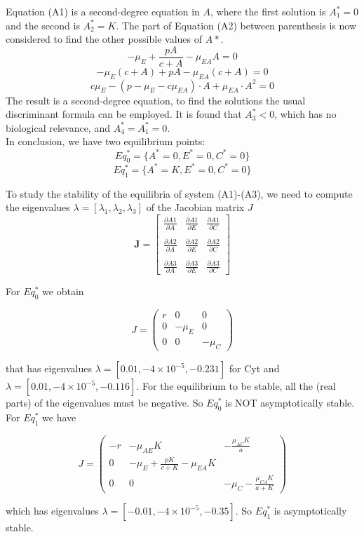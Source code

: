 Equation (A1) is a second-degree equation in $A$, where the first solution is $A^*_1=0$ and the second is $A^*_2=K$. The part of Equation (A2) between parenthesis is now considered to find the other possible values of $A*$.
\[ -\mu_E + \frac{pA}{c+A} - \mu_{EA}A = 0 \]
\[ -\mu_E(c+A) + pA - \mu_{EA}(c+A) = 0\]
\[c\mu_E - (p -\mu_E - c\mu_{EA})\cdot A + \mu_{EA}\cdot A^2 = 0\]
The result is a second-degree equation, to find the solutions the usual discriminant formula can be employed. It is found that $A^*_3 < 0$, which has no biological relevance, and $A^*_4 = A^*_1 = 0$.\\
In conclusion, we have two equilibrium points: 
\[Eq_0^* = \{A^* = 0, E^* = 0, C^* = 0\}\]
\[Eq_1^* = \{A^* = K, E^* = 0, C^* = 0\}\]

To study the stability of the equilibria of system (A1)-(A3), we need to compute the eigenvalues $\lambda = [\lambda_1,\lambda_2,\lambda_3]$ of the Jacobian matrix $J$
\[ \mathbf{J} = \begin{bmatrix} \frac{\partial A1}{\partial A} & \frac{\partial A1}{\partial E} & \frac{\partial A1}{\partial C} \\ \\
\frac{\partial A2}{\partial A} & \frac{\partial A2}{\partial E} & \frac{\partial A2}{\partial C}\\ \\
\frac{\partial A3}{\partial A} & \frac{\partial A3}{\partial E} & \frac{\partial A3}{\partial C} \end{bmatrix} \]

For $Eq_0^*$ we obtain

\[ J = \begin{pmatrix} r&0&0 \\ 0&-\mu_E&0 \\ 0&0&-\mu_C \end{pmatrix} \]

that has eigenvalues $\lambda = [0.01,-4\times 10^{-5},-0.231]$ for Cyt and $\lambda = [0.01,-4\times 10^{-5},-0.116]$. For the equilibrium to be stable, all the (real parts) of the eigenvalues must be negative. So $Eq_0^*$ is NOT asymptotically stable.\\

For $Eq_1^*$ we have

\[ J = \begin{pmatrix} -r & -\mu_{AE}K & -\frac{\mu_{AC}K}{a} \\ 0 & -\mu_E + \frac{pK}{c+K} - \mu_{EA}K \\ 0&0& -\mu_C - \frac{\mu_{CA}K}{a+K} \end{pmatrix} \]

which has eigenvalues $\lambda = [-0.01, -4\times 10^{-5}, -0.35]$. So $Eq_1^*$ is asymptotically stable.

